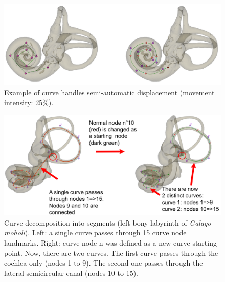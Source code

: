 \begin{figure}
  \centering
  \includegraphics[scale=0.23]{images/10/move_selected_handles_input_output.png} 
	\caption{Example of curve handles semi-automatic displacement (movement intensity: 25\%).}
\label{move_handles2}
 
\end{figure}

\begin{figure}
  \centering
  \includegraphics[scale=0.23]{images/10/change_node_as_curve_starting_point.png} 
	\caption{Curve decomposition into segments (left bony labyrinth of \textit{Galago moholi}). Left: a single curve passes through 15 curve node landmarks. Right: curve node n was defined as a new curve starting point. Now, there are two curves. The first curve passes through the cochlea only (nodes 1 to 9). The second one passes through the lateral semicircular canal (nodes 10 to 15).}
\label{starting_node}
 
\end{figure}


